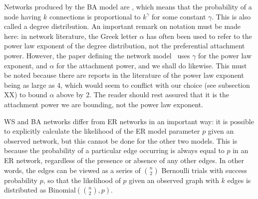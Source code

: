 Networks produced by the BA model are , which means that the
probability of a node having $k$ connections is proportional to $k^\gamma$ for
some constant $\gamma$. This is also called a  degree
distribution. An important remark on notation must be made here: in network
literature, the Greek letter $\alpha$ has often been used to refer to the power
law exponent of the degree distribution, not the preferential attachment power.
However, the paper defining the network model~\autocite{barabasi1999emergence}
uses $\gamma$ for the power law exponent, and $\alpha$ for the attachment
power, and we shall do likewise. This must be noted because there are reports
in the literature of the power law exponent being as large as 4, which would
seem to conflict with our choice (see subsection XX) to bound $\alpha$ above by
2. The reader should rest assured that it is the attachment power we are
bounding, not the power law exponent.

WS and BA networks differ from ER networks in an important way: it is possible
to explicitly calculate the likelihood of the ER model parameter $p$ given an
observed network, but this cannot be done for the other two models. This is
because the probability of a particular edge occurring is always equal to $p$ in
an ER network, regardless of the presence or absence of any other edges. In
other words, the edges can be viewed as a series of $\binom{n}{2}$ Bernoulli
trials with success probability $p$, so that the likelihood of $p$ given an
observed graph with $k$ edges is distributed as 
Binomial$\left(\binom{n}{2}, p\right)$.


